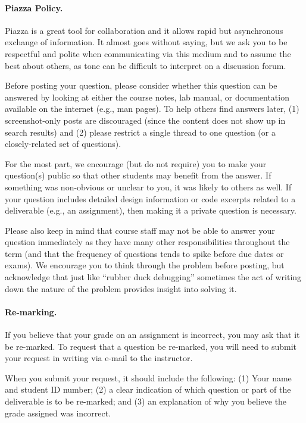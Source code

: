 \documentclass[letterpaper,10pt]{article}
\begin{document}
\paragraph{Piazza Policy.}
Piazza is a great tool for collaboration and it allows rapid but asynchronous exchange of information. It almost goes without saying, but we ask you to be respectful and polite when communicating via this medium and to assume the best about others, as tone can be difficult to interpret on a discussion forum. 

Before posting your question, please consider whether this question can be answered by looking at either the course notes, lab manual, or documentation available on the internet (e.g., man pages). To help others find answers later, (1) screenshot-only posts are discouraged (since the content does not show up in search results) and (2) please restrict a single thread to one question (or a closely-related set of questions).

For the most part, we encourage (but do not require) you to make your question(s) public so that other students may benefit from the answer. If something was non-obvious or unclear to you, it was likely to others as well. If your question includes detailed design information or code excerpts related to a deliverable (e.g., an assignment), then making it a private question is necessary.

Please also keep in mind that course staff may not be able to answer your question immediately as they have many other responsibilities throughout the term (and that the frequency of questions tends to spike before due dates or exams). We encourage you to think through the problem before posting, but acknowledge that just like ``rubber duck debugging'' sometimes the act of writing down the nature of the problem provides insight into solving it.

\paragraph{Re-marking.}
If you believe that your grade on an assignment is incorrect, you may ask that it be re-marked. To request that a question be re-marked, you will need to submit your request in writing via e-mail to the instructor.

When you submit your request, it should include the following: (1) Your name and student ID number; (2) a clear indication of which question or part of the deliverable is to be re-marked; and (3) an explanation of why you believe the grade assigned was incorrect.
\end{document}
